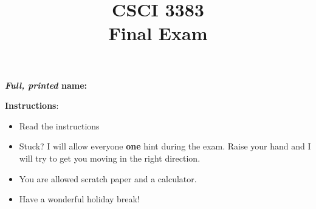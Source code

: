 \documentclass[12pt]{article}
\title{CSCI 3383 \\Final Exam}
\date{}
\begin{document}
\maketitle
\textbf{\emph{Full, printed} name: }
\vspace{1cm}

\textbf{Instructions}: 
\begin{itemize}
    \item Read the instructions
    \item Stuck? I will allow everyone \textbf{one} hint during the exam. Raise your hand and I will try to get you moving in the right direction.  
    \item You are allowed scratch paper and a calculator. 
    \item Have a wonderful holiday break!
\end{itemize} 

\end{document}

